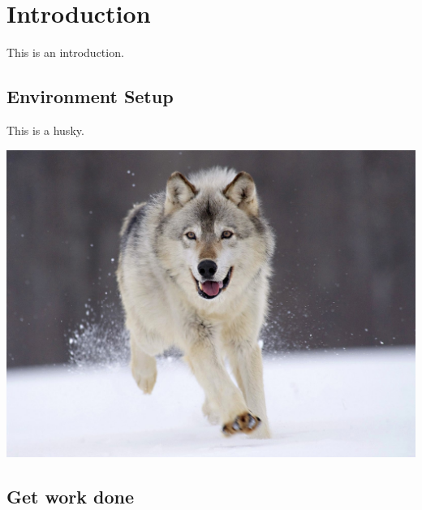 
\chapter{Introduction}
\minitoc

This is an introduction.

\section{Environment Setup}

This is a husky.

\includegraphics[scale=0.25]{chapter1/husky}

\blindtext[3]

\section{Get work done}

\blindtext[3]
